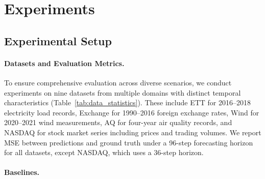
\vspace{-0.06in}
\section{Experiments}
\vspace{0.04in}
\subsection{Experimental Setup}



\paragraph{Datasets and Evaluation Metrics.}

To ensure comprehensive evaluation across diverse scenarios, we conduct experiments on nine datasets from multiple domains with distinct temporal characteristics (Table~\ref{tab:data_statistics}). These include ETT \citep{zhou2021informer} for 2016--2018 electricity load records, Exchange \citep{lai2018modeling} for 1990--2016 foreign exchange rates, Wind \citep{lai2018modeling} for 2020--2021 wind measurements, AQ \citep{zhang2017cautionary} for four-year air quality records, and NASDAQ \citep{feng2019temporal} for stock market series including prices and trading volumes.
We report MSE between predictions and ground truth under a 96-step forecasting horizon for all datasets, except NASDAQ, which uses a 36-step horizon.




\paragraph{Baselines.}

